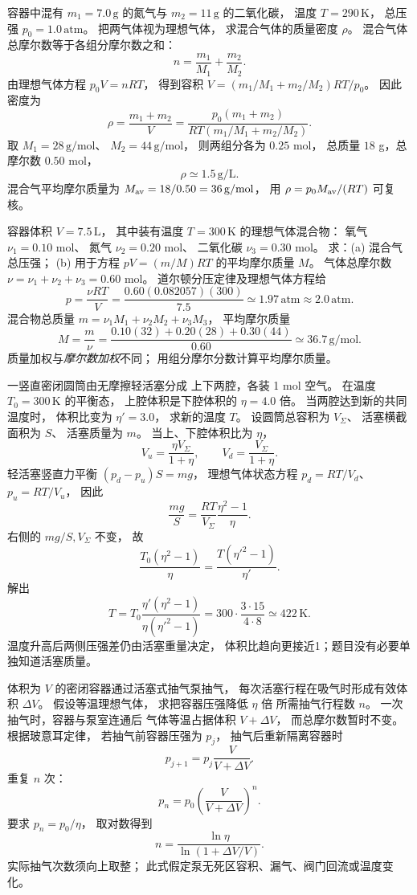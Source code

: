 容器中混有
$m_1=7.0\,\mathrm g$ 的氮气与
$m_2=11\,\mathrm g$ 的二氧化碳，
温度 $T=290\,\mathrm K$，
总压强 $p_0=1.0\,\mathrm{atm}$。
把两气体视为理想气体，
求混合气体的质量密度 $\rho$。
\exsolution
混合气体总摩尔数等于各组分摩尔数之和：
\[
n=\frac{m_1}{M_1}+\frac{m_2}{M_2}.
\]
由理想气体方程
$p_0V=nRT$，
得到容积
$V=(m_1/M_1+m_2/M_2)RT/p_0$。
因此密度为
\[
\boxed{\rho=\frac{m_1+m_2}{V}
=\frac{p_0(m_1+m_2)}
{RT(m_1/M_1+m_2/M_2)}}.
\]
取 $M_1=28\,\mathrm{g/mol}$、
$M_2=44\,\mathrm{g/mol}$，
则两组分各为 $0.25$ mol，
总质量 $18$ g，总摩尔数 $0.50$ mol，
\[
\boxed{\rho\simeq1.5\,\mathrm{g/L}}.
\]
\excheck 混合气平均摩尔质量为
$M_{\rm av}=18/0.50=36\,\mathrm{g/mol}$，
用 $\rho=p_0M_{\rm av}/(RT)$ 可复核。

容器体积 $V=7.5\,\mathrm L$，
其中装有温度 $T=300\,\mathrm K$
的理想气体混合物：
氧气 $\nu_1=0.10$ mol、
氮气 $\nu_2=0.20$ mol、
二氧化碳 $\nu_3=0.30$ mol。
求：(a) 混合气总压强；
(b) 用于方程 $pV=(m/M)RT$
的平均摩尔质量 $M$。
\exsolution
气体总摩尔数
$\nu=\nu_1+\nu_2+\nu_3=0.60$ mol。
道尔顿分压定律及理想气体方程给
\[
\boxed{p=\frac{\nu RT}{V}
=\frac{0.60(0.082057)(300)}{7.5}
\simeq1.97\,\mathrm{atm}\approx2.0\,\mathrm{atm}}.
\]
混合物总质量
$m=\nu_1M_1+\nu_2M_2+\nu_3M_3$，
平均摩尔质量
\[
\boxed{M=\frac{m}{\nu}
=\frac{0.10(32)+0.20(28)+0.30(44)}
{0.60}
\simeq36.7\,\mathrm{g/mol}}.
\]
\excheck 质量加权与\emph{摩尔数加权}不同；
用组分摩尔分数计算平均摩尔质量。

一竖直密闭圆筒由无摩擦轻活塞分成
上下两腔，各装 1 mol 空气。
在温度 $T_0=300\,\mathrm K$ 的平衡态，
上腔体积是下腔体积的
$\eta=4.0$ 倍。
当两腔达到新的共同温度时，
体积比变为 $\eta'=3.0$，
求新的温度 $T$。
\exsolution
设圆筒总容积为 $V_\Sigma$、
活塞横截面积为 $S$、
活塞质量为 $m$。
当上、下腔体积比为 $\eta$，
\[
V_u=\frac{\eta V_\Sigma}{1+\eta},
\qquad V_d=\frac{V_\Sigma}{1+\eta}.
\]
轻活塞竖直力平衡
$(p_d-p_u)S=mg$，
理想气体状态方程
$p_d=RT/V_d$、
$p_u=RT/V_u$，
因此
\[
\frac{mg}{S}
=\frac{RT}{V_\Sigma}
\frac{\eta^2-1}{\eta}.
\]
右侧的 $mg/S,V_\Sigma$ 不变，
故
\[
\frac{T_0(\eta^2-1)}{\eta}
=\frac{T(\eta'^2-1)}{\eta'}.
\]
解出
\[
\boxed{T=T_0
\frac{\eta'(\eta^2-1)}
{\eta(\eta'^2-1)}}
=\boxed{300\cdot\frac{3\cdot15}{4\cdot8}
\simeq422\,\mathrm K}.
\]
\excheck 温度升高后两侧压强差仍由活塞重量决定，
体积比趋向更接近1；题目没有必要单独知道活塞质量。

体积为 $V$ 的密闭容器通过活塞式抽气泵抽气，
每次活塞行程在吸气时形成有效体积 $\Delta V$。
假设等温理想气体，
求把容器压强降低 $\eta$ 倍
所需抽气行程数 $n$。
\exsolution
一次抽气时，容器与泵室连通后
气体等温占据体积 $V+\Delta V$，
而总摩尔数暂时不变。
根据玻意耳定律，
若抽气前容器压强为 $p_j$，
抽气后重新隔离容器时
\[
p_{j+1}=p_j\frac{V}{V+\Delta V}.
\]
重复 $n$ 次：
\[
p_n=p_0\left(\frac{V}{V+\Delta V}\right)^n.
\]
要求 $p_n=p_0/\eta$，
取对数得到
\[
\boxed{n=\frac{\ln\eta}
{\ln(1+\Delta V/V)}}.
\]
\excheck 实际抽气次数须向上取整；
此式假定泵无死区容积、漏气、阀门回流或温度变化。

